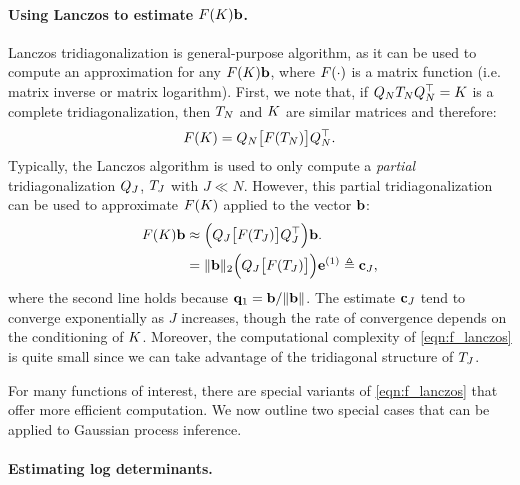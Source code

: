 \paragraph{Using Lanczos to estimate $F (K) \mathbf{b}$.}
Lanczos tridiagonalization is general-purpose algorithm, as it can be used to compute an approximation for any $F(K) \mathbf{b}$, where $F( \cdot )$ is a matrix function (i.e. matrix inverse or matrix logarithm).
First, we note that, if $Q_N T_N Q_N^\top = K$ is a complete tridiagonalization, then $T_N$ and $K$ are similar matrices and therefore:
\begin{equation}
  F ( K ) = Q_N \bigl[ F ( T_N ) \bigr] Q_N^\top.
  \label{eqn:f_tridiagonal}
\end{equation}
%
%
Typically, the Lanczos algorithm is used to only compute a \emph{partial} tridiagonalization $Q_J$, $T_J$ with $J \ll N$.
However, this partial tridiagonalization can be used to approximate $F ( K )$ applied to the vector $\mathbf{b}$:
%
\begin{align}
  F ( K ) \mathbf{b}
  &\approx \Bigl( Q_J \bigl[ F ( T_J ) \bigr] Q_J^\top \Bigr) \mathbf{b}.
  \nonumber \\
  &= \Vert \mathbf{b} \Vert_2 \Bigl( Q_J \bigl[ F ( T_J ) \bigr] \Bigr) \mathbf{e}^{(1)}
  \triangleq \mathbf{c}_J,
  \label{eqn:f_lanczos}
\end{align}
%
where the second line holds because $\mathbf{q}_1 = \mathbf{b} / \Vert \mathbf{b} \Vert$.
The estimate $\mathbf{c}_J$ tend to converge exponentially as $J$ increases, though the rate of convergence depends on the conditioning of $K$.
Moreover, the computational complexity of \cref{eqn:f_lanczos} is quite small since we can take advantage of the tridiagonal structure of $T_J$.

For many functions of interest, there are special variants of \cref{eqn:f_lanczos} that offer more efficient computation.
We now outline two special cases that can be applied to Gaussian process inference.

\paragraph{Estimating log determinants.}

